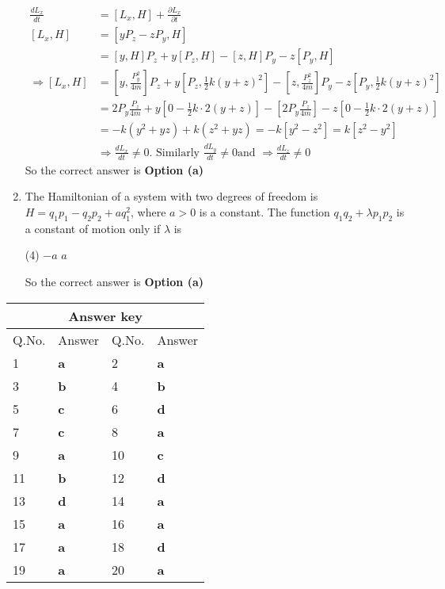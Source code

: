 \begin{enumerate}
\begin{answer}
\begin{align*}
	\frac{d L_{x}}{d t}&=\left[L_{x}, H\right]+\frac{\partial L_{x}}{\partial t}\\
	\left[L_{x}, H\right]&=\left[y P_{z}-z P_{y}, H\right]\\&=[y, H] P_{z}+y\left[P_{z}, H\right]-[z, H] P_{y}-z\left[P_{y}, H\right]\\
	\Rightarrow\left[L_{x}, H\right]&=\left[y, \frac{P_{y}^{2}}{4 m}\right] P_{z}+y\left[P_{z}, \frac{1}{2} k(y+z)^{2}\right]-\left[z, \frac{P_{z}^{2}}{4 m}\right] P_{y}-z\left[P_{y}, \frac{1}{2} k(y+z)^{2}\right]\\
	&=2 P_{y} \frac{P_{z}}{4 m}+y\left[0-\frac{1}{2} k \cdot 2(y+z)\right]-\left[2 P_{y} \frac{P_{z}}{4 m}\right]-z\left[0-\frac{1}{2} k \cdot 2(y+z)\right]\\
	&=-k\left(y^{2}+y z\right)+k\left(z^{2}+y z\right)=-k\left[y^{2}-z^{2}\right]=k\left[z^{2}-y^{2}\right]\\
	&\Rightarrow \frac{d L_{x}}{d t} \neq 0 .\text{ Similarly }\frac{d L_{y}}{d t} \neq 0 \text{and }\Rightarrow \frac{d L_{z}}{d t} \neq 0
	\end{align*}
	So the correct answer is \textbf{Option (a)}
\end{answer}
	\item  The Hamiltonian of a system with two degrees of freedom is $H=q_{1} p_{1}-q_{2} p_{2}+a q_{1}^{2}$, where $a>0$ is a constant. The function $q_{1} q_{2}+\lambda p_{1} p_{2}$ is a constant of motion only if $\lambda$ is
	{}
	\begin{tasks}(4)
		\task[\textbf{c.}]$-a$
		\task[\textbf{d.}]$a$ 
	\end{tasks}
\begin{answer}
	So the correct answer is \textbf{Option (a)}
\end{answer}
\end{enumerate}
\setlength\arrayrulewidth{1pt}
\begin{table}[H]
	\centering
	\begin{tabular}{|p{1.5cm}|p{1.5cm}||p{1.5cm}|p{1.5cm}|}
		\hline
		\multicolumn{4}{|c|}{\textbf{Answer key}}\\\hline\hline
		\rowcolor{ocrel}Q.No.&Answer&Q.No.&Answer\\\hline
		1&\textbf{a} &2&\textbf{a}\\\hline 
		3&\textbf{b} &4&\textbf{b} \\\hline
		5&\textbf{c} &6&\textbf{d} \\\hline
		7&\textbf{c}&8&\textbf{a}\\\hline
		9&\textbf{a}&10&\textbf{c}\\\hline
		11&\textbf{b}&12&\textbf{d}\\\hline
		13&\textbf{d}&14&\textbf{a}\\\hline
		15&\textbf{a}&16&\textbf{a}\\\hline
		17&\textbf{a} &18&\textbf{d}\\\hline
		19&\textbf{a}&20&\textbf{a}\\\hline
		
	\end{tabular}
\end{table}
